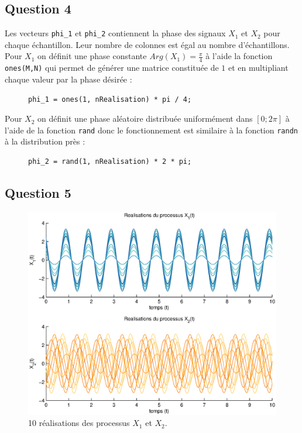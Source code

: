 \documentclass{article}
\begin{document}
\subsection*{Question 4}
Les vecteurs \texttt{phi\_1} et \texttt{phi\_2} contiennent la phase des signaux $X_1$ et $X_2$ pour chaque échantillon. Leur nombre de colonnes est égal au nombre d'échantillons. \\
Pour $X_1$ on définit une phase constante $\mathit{Arg}(X_1) = \frac{\pi}{4}$ à l'aide la fonction \texttt{ones(M,N)} qui permet de générer une matrice constituée de $1$ et en multipliant chaque valeur par la phase désirée :
\begin{figure}[h]
\centering
\begin{verbatim}
phi_1 = ones(1, nRealisation) * pi / 4;
\end{verbatim}
\end{figure}

\noindent
Pour $X_2$ on définit une phase aléatoire distribuée uniformément dans $[0;2\pi]$ à l'aide de la fonction \texttt{rand} donc le fonctionnement est similaire à la fonction \texttt{randn} à la distribution près :
\begin{figure}[h]
\centering
\begin{verbatim}
phi_2 = rand(1, nRealisation) * 2 * pi;
\end{verbatim}
\end{figure}

\subsection*{Question 5}

\begin{figure}[h!]
\hspace*{-0.8cm}
\includegraphics[width=12cm]{q5.eps}
\caption{10 réalisations des processus $X_1$ et $X_2$.}
\end{figure}
\end{document}
